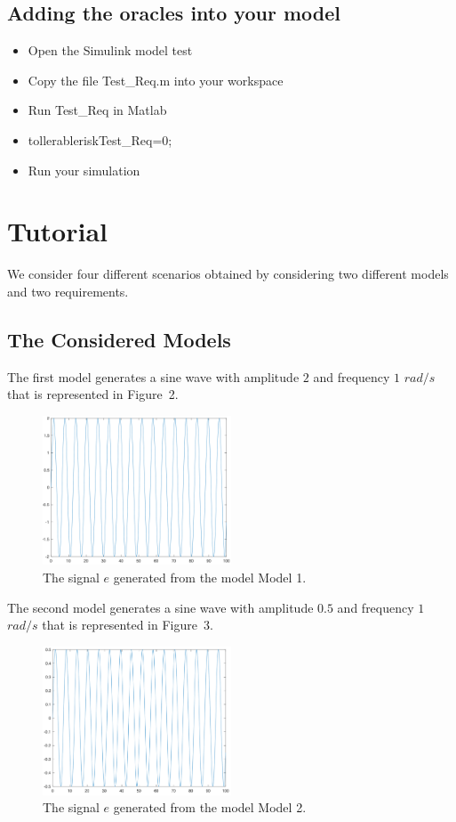 \documentclass[12pt]{extarticle}
\newcommand{\<}{\langle}
\renewcommand{\>}{\rangle}
\theoremstyle{definition}
\begin{document}
\subsection{Adding the oracles into your model}
\begin{itemize}
\item	Open the Simulink model test
\item	Copy the file Test\_Req.m into your workspace
\item	Run Test\_Req in Matlab
\item	tollerableriskTest\_Req=0;
\item	Run your simulation
\end{itemize}


\clearpage
\section{Tutorial}
We consider four different scenarios obtained by considering two different models and two requirements.

\subsection{The Considered Models}
The first model generates a sine wave with amplitude $2$ and frequency $1$ $rad/s$ that is represented in Figure~2.

\begin{figure}[h]
\caption{The signal $e$ generated from the model Model 1.}
  \centering
    \includegraphics[width=0.5\textwidth]{Manual/Model1.png}
\end{figure}

\noindent The second model generates a sine wave with amplitude $0.5$ and frequency $1$ $rad/s$ that is represented in Figure~3.

\begin{figure}[h]
\caption{The signal $e$ generated from the model Model 2.}
  \centering
    \includegraphics[width=0.5\textwidth]{Manual/Model2.png}
\end{figure}
\end{document}
